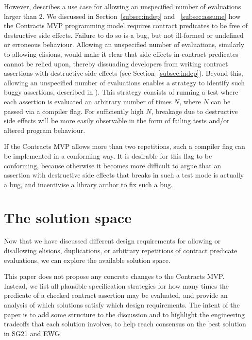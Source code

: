 However, \cite{P3119R0} describes a use case for allowing an unspecified number of evaluations larger than 2. We discussed in Section~\ref{subsec:indep} and ~\ref{subsec:assume} how the Contracts MVP programming model requires contract predicates to be free of destructive side effects. Failure to do so is a bug, but not ill-formed or undefined or erroneous behaviour. Allowing an unspecified number of evaluations, similarly to allowing elisions, would make it clear that side effects in contract predicates cannot be relied upon, thereby dissuading developers from writing contract assertions with destructive side effects (see Section~\ref{subsec:indep}). Beyond this, allowing an unspecified number of evaluations enables a strategy to identify such buggy assertions, described in \cite{P3119R0}). This strategy consists of running a test where each assertion is evaluated an arbitrary number of times $N$, where $N$ can be passed via a compiler flag. For sufficiently high $N$, breakage due to destructive side effects will be more easily observable in the form of failing tests and/or altered program behaviour.

If the Contracts MVP allows more than two repetitions, such a compiler flag can be implemented in a conforming way. It is desirable for this flag to be conforming, because otherwise it becomes more difficult to argue that an assertion with destructive side effects that breaks in such a test mode is actually a bug, and incentivise a library author to fix such a bug.


\section{The solution space}
\label{sec:prepost}

Now that we have discussed different design requirements for allowing or disallowing elisions, duplications, or arbitrary repetitions of contract predicate evaluations, we can explore the available solution space. 

This paper does not propose any concrete changes to the Contracts MVP. Instead, we list all plausible specification strategies for how many times the predicate of a checked contract assertion may be evaluated, and provide an analysis of which solutions satisfy which design requirements. The intent of the paper is to add some structure to the discussion and to highlight the engineering tradeoffs that each solution involves, to help reach consensus on the best solution in SG21 and EWG.

